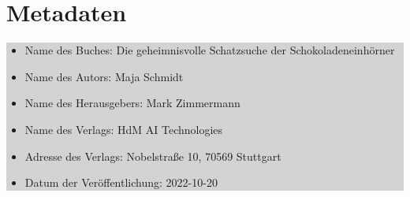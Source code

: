\documentclass[12pt]{article} %
\begin{document}
\clearpage
\section*{Metadaten}
\begin{minipage}{\textwidth}
    \colorbox{lightgray}{
        \begin{minipage}{\dimexpr\textwidth-2\fboxsep}
            \vspace{4cm}
            \begin{itemize}
                \item Name des Buches: Die geheimnisvolle Schatzsuche der Schokoladeneinhörner
                \item Name des Autors: Maja Schmidt
                \item Name des Herausgebers: Mark Zimmermann
                \item Name des Verlags: HdM AI Technologies
                \item Adresse des Verlags: Nobelstraße 10, 70569 Stuttgart
                \item Datum der Veröffentlichung: 2022-10-20
            \end{itemize}
            \vspace{4cm}
        \end{minipage}

    }
\end{minipage}
\end{document}
